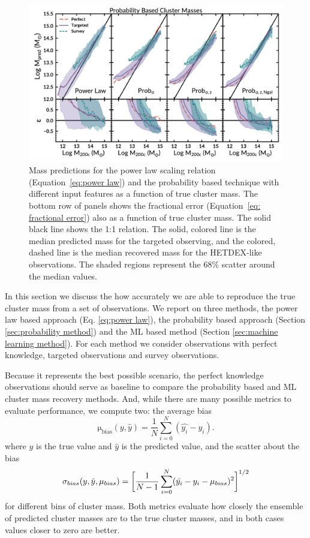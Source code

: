 \documentclass[fleqn,usenatbib]{mnras}
\begin{document}
\begin{figure} 
	\includegraphics[width=\textwidth]{figures/Probcomparison.pdf} 
	\caption{Mass predictions for the power law scaling relation (Equation~\ref{eq:power law}) and the probability based technique with different input features as a function of true cluster mass. The bottom row of panels shows the fractional error (Equation~\ref{eq: fractional error}) also as a function of true cluster mass. The solid black line shows the 1:1 relation. The solid, colored line is the median predicted mass for the targeted observing, and the colored, dashed line is the median recovered mass for the HETDEX-like observations. The shaded regions represent the 68\% scatter around the median values.} \label{fig:Probability comparison} 
\end{figure}

In this section we discuss the how accurately we are able to reproduce the true cluster mass from a set of observations. We report on three methods, the power law based approach (Eq. \ref{eq:power law}), the probability based approach (Section \ref{sec:probability method}) and the ML based method (Section \ref{sec:machine learning method}). For each method we consider observations with perfect knowledge, targeted observations and survey observations.

Because it represents the best possible scenario, the perfect knowledge observations should serve as baseline to compare the probability based and ML cluster mass recovery methods. And, while there are many possible metrics to evaluate performance, we compute two: the average bias 
\begin{equation}
\mathrm{\mu_{bias}}(y,\hat{y}) = \frac{1}{N} \sum_{i=0}^N (\hat{y_i} - y_i).
\end{equation}
where $y$ is the true value and $\hat{y}$ is the predicted value, and the scatter about the bias
\begin{equation}
	\sigma_{bias}(y,\hat{y}, \mu_{bias}) = \bigg{[}\frac{1}{N-1} \sum_{i=0}^N (\hat{y_i} - y_i - \mu_{bias})^2 \bigg{]}^{1/2}
\end{equation}
for different bins of cluster mass. Both metrics evaluate how closely the ensemble of predicted cluster masses are to the true cluster masses, and in both cases values closer to zero are better.
\end{document}
